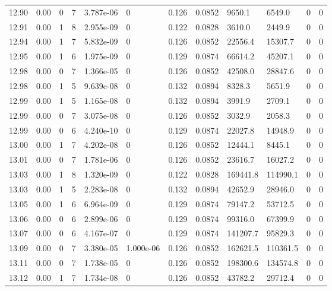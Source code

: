 \documentclass[preview]{standalone}
\begin{document}
{{{{{{{{{{{{{{{{\begin{tabular}{L{1.2cm}C{1.2cm} C{0.3cm}C{0.5cm} C{1.4cm}C{1.4cm} C{1.4cm}C{1.4cm} C{1.6cm}C{1.6cm} C{1.6cm}C{1.6cm}}
  12.90  &  0.00  & 0     &  7 &  3.787e-06  & 0  &  0.126&   0.0852& 9650.1 & 6549.0   &  0 & 0  \\ 
  12.91  &  0.00  & 1     &  8 &  2.955e-09  & 0  &  0.122&   0.0828& 3610.0 & 2449.9   &  0 & 0  \\ 
  12.94  &  0.00  & 1     &  7 &  5.832e-09  & 0  &  0.126&   0.0852& 22556.4 & 15307.7   &  0 & 0  \\ 
  12.95  &  0.00  & 1     &  6 &  1.975e-09  & 0  &  0.129&   0.0874& 66614.2 & 45207.1   &  0 & 0  \\ 
  12.98  &  0.00  & 0     &  7 &  1.366e-05  & 0  &  0.126&   0.0852& 42508.0 & 28847.6   &  0 & 0  \\ 
  12.98  &  0.00  & 1     &  5 &  9.639e-08  & 0  &  0.132&   0.0894& 8328.3 & 5651.9   &  0 & 0  \\ 
  12.99  &  0.00  & 1     &  5 &  1.165e-08  & 0  &  0.132&   0.0894& 3991.9 & 2709.1   &  0 & 0  \\ 
  12.99  &  0.00  & 0     &  7 &  3.075e-08  & 0  &  0.126&   0.0852& 3032.9 & 2058.3   &  0 & 0  \\ 
  12.99  &  0.00  & 0     &  6 &  4.240e-10  & 0  &  0.129&   0.0874& 22027.8 & 14948.9   &  0 & 0  \\ 
  13.00  &  0.00  & 1     &  7 &  4.202e-08  & 0  &  0.126&   0.0852& 12444.1 & 8445.1   &  0 & 0  \\ 
  13.01  &  0.00  & 0     &  7 &  1.781e-06  & 0  &  0.126&   0.0852& 23616.7 & 16027.2   &  0 & 0  \\ 
  13.03  &  0.00  & 1     &  8 &  1.320e-09  & 0  &  0.122&   0.0828& 169441.8 & 114990.1   &  0 & 0  \\ 
  13.03  &  0.00  & 1     &  5 &  2.283e-08  & 0  &  0.132&   0.0894& 42652.9 & 28946.0   &  0 & 0  \\ 
  13.05  &  0.00  & 1     &  6 &  6.964e-09  & 0  &  0.129&   0.0874& 79147.2 & 53712.5   &  0 & 0  \\ 
  13.06  &  0.00  & 0     &  6 &  2.899e-06  & 0  &  0.129&   0.0874& 99316.0 & 67399.9   &  0 & 0  \\ 
  13.07  &  0.00  & 0     &  6 &  4.167e-07  & 0  &  0.129&   0.0874& 141207.7 & 95829.3   &  0 & 0  \\ 
  13.09  &  0.00  & 0     &  7 &  3.380e-05  & 1.000e-06  &  0.126&   0.0852& 162621.5 & 110361.5   &  0 & 0  \\ 
  13.11  &  0.00  & 0     &  7 &  1.738e-05  & 0  &  0.126&   0.0852& 198300.6 & 134574.8   &  0 & 0  \\ 
  13.12  &  0.00  & 1     &  7 &  1.734e-08  & 0  &  0.126&   0.0852& 43782.2 & 29712.4   &  0 & 0  \\ 

\end{tabular}}}}}}}}}}}}}}}}}
\end{document}
